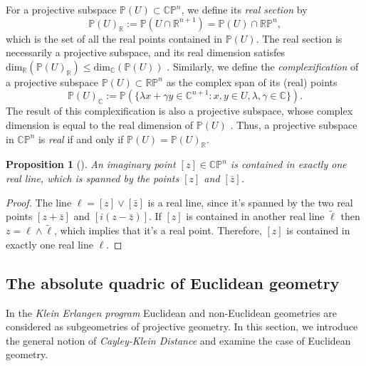 \documentclass[10pt, a4paper]{article}
\theoremstyle{BoldTopSpacing}
\theoremstyle{BoldTopSpacing}
\theoremstyle{BoldTopSpacing}
\theoremstyle{BoldTopBottomSpacing}
\theoremstyle{BoldTopSpacing}
\newtheorem{proposition}{Proposition}[section]
\theoremstyle{BoldTopBottomSpacing}
\theoremstyle{remark}
\begin{document}
For a projective subspace $\mathbb{P}(U) \subset \mathbb{C}\mathbb{P}^n$, we define its \textit{real section} by
\[
    \mathbb{P}(U)_{\mathbb{R}} := \mathbb{P}(U \cap \mathbb{R}^{n+1}) = \mathbb{P}(U) \cap \mathbb{R}\mathbb{P}^n,
\]
which is the set of all the real points contained in $\mathbb{P}(U)$. The real section is necessarily a projective subspace, and its real dimension satisfes  $\text{dim}_{\mathbb{R}}\left(\mathbb{P}(U)_{\mathbb{R}}\right) \leq \text{dim}_{\mathbb{C}}\left(\mathbb{P}(U)\right)$ \cite{geometryII}.
Similarly, we define the \textit{complexification} of a projective subspace $\mathbb{P}(U) \subset \mathbb{R}\mathbb{P}^n$ as the complex span of its (real) points
\[
    \mathbb{P}(U)_{\mathbb{C}} := \mathbb{P}(\{ \lambda x + \gamma y \in \mathbb{C}^{n+1} : x, y \in U, \lambda, \gamma \in \mathbb{C} \}).
\]
The result of this complexification is also a projective subspace, whose complex dimension is equal to the real dimension of $\mathbb{P}(U)$ \cite{geometryII}. Thus, a projective subspace in $\mathbb{C}\mathbb{P}^n$ is \textit{real} if and only if $\mathbb{P}(U) = \mathbb{P}(U)_{\mathbb{R}}$. \par

\begin{proposition}[]
\label{thm:span-real-line}
An imaginary point $[z] \in \mathbb{C}\mathbb{P}^n$ is contained in exactly one real line, which is spanned by the points $[z]$ and $[\bar{z}]$.
\end{proposition}

\begin{proof}
The line $\ell = [z] \vee [\bar{z}]$ is a real line, since it's spanned by the two real points $[z + \bar{z}]$ and $[i(z - \bar{z})]$. If $[z]$ is contained in another real line $\tilde{\ell}$ then $z = \ell \wedge \tilde{\ell}$, which implies that it's a real point. Therefore, $[z]$ is contained in exactly one real line $\ell$.
\end{proof}

\subsection{The absolute quadric of Euclidean geometry}
\label{subsec:absolute-quadrics}

In the \textit{Klein Erlangen program} Euclidean and non-Euclidean geometries are considered as subgeometries of projective geometry. In this section, we introduce the general notion of \textit{Cayley-Klein Distance} \cite[\textcolor{CitationColor}{Ch.~4}]{bobenkoNonEuclideanLaguerreGeometry} and examine the case of Euclidean geometry. \par
\end{document}
